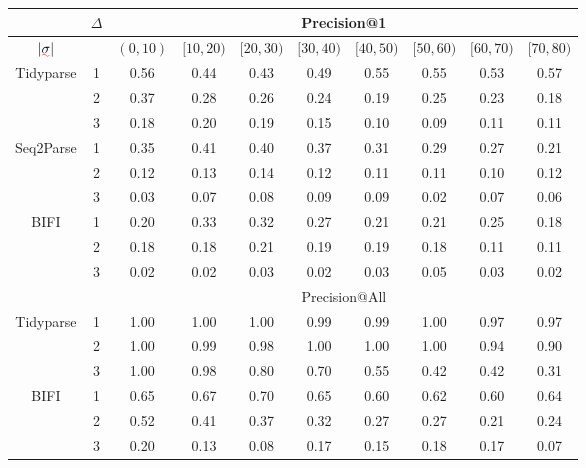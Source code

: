 \documentclass[sigplan,acmsmall,nonacm,screen]{acmart}\settopmatter{printfolios=false,printccs=false,printacmref=false}
\begin{document}
  \begin{table}[!h]
    \centering
    \begin{tabular}{c|c|cccccccc}
      \hline\hline
      & $\Delta$ & \multicolumn{8}{c}{Precision@1} \\ \hline
      $|\err\sigma|$ &  & $(0,10)$ & $[10,20)$ & $[20,30)$ & $[30, 40)$ & $[40,50)$ & $[50, 60)$ & $[60,70)$ & $[70, 80)$ \\ \hline
      Tidyparse
      & 1 & 0.56 & 0.44 & 0.43 & 0.49 & 0.55 & 0.55 & 0.53 & 0.57 \\
      & 2 & 0.37 & 0.28 & 0.26 & 0.24 & 0.19 & 0.25 & 0.23 & 0.18 \\
      & 3 & 0.18 & 0.20 & 0.19 & 0.15 & 0.10 & 0.09 & 0.11 & 0.11 \\ \hline
      Seq2Parse
      & 1 & 0.35 & 0.41 & 0.40 & 0.37 & 0.31 & 0.29 & 0.27 & 0.21 \\
      & 2 & 0.12 & 0.13 & 0.14 & 0.12 & 0.11 & 0.11 & 0.10 & 0.12 \\
      & 3 & 0.03 & 0.07 & 0.08 & 0.09 & 0.09 & 0.02 & 0.07 & 0.06 \\ \hline
      BIFI
      & 1 & 0.20 & 0.33 & 0.32 & 0.27 & 0.21 & 0.21 & 0.25 & 0.18 \\
      & 2 & 0.18 & 0.18 & 0.21 & 0.19 & 0.19 & 0.18 & 0.11 & 0.11 \\
      & 3 & 0.02 & 0.02 & 0.03 & 0.02 & 0.03 & 0.05 & 0.03 & 0.02 \\ \hline
      & & \multicolumn{8}{c}{Precision@All} \\ \hline
      Tidyparse
      & 1 & 1.00 & 1.00 & 1.00 & 0.99 & 0.99 & 1.00 & 0.97 & 0.97 \\
      & 2 & 1.00 & 0.99 & 0.98 & 1.00 & 1.00 & 1.00 & 0.94 & 0.90 \\
      & 3 & 1.00 & 0.98 & 0.80 & 0.70 & 0.55 & 0.42 & 0.42 & 0.31 \\ \hline
      BIFI
      & 1 & 0.65 & 0.67 & 0.70 & 0.65 & 0.60 & 0.62 & 0.60 & 0.64 \\
      & 2 & 0.52 & 0.41 & 0.37 & 0.32 & 0.27 & 0.27 & 0.21 & 0.24 \\
      & 3 & 0.20 & 0.13 & 0.08 & 0.17 & 0.15 & 0.18 & 0.17 & 0.07 \\ \hline\hline
    \end{tabular}
  \end{table}
\end{document}
